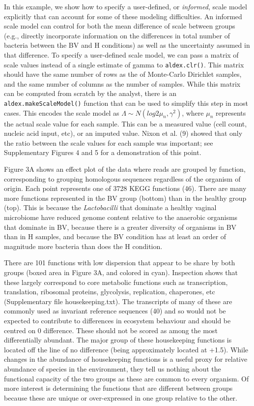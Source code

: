 \documentclass[
]{article}
\begin{document}
In this example, we show how to specify a user-defined, or
\emph{informed}, scale model explicitly that can account for some of
these modeling difficulties. An informed scale model can control for
both the mean difference of scale between groups (e.g., directly
incorporate information on the differences in total number of bacteria
between the BV and H conditions) as well as the uncertainty assumed in
that difference. To specify a user-defined scale model, we can pass a
matrix of scale values instead of a single estimate of gamma to
\texttt{aldex.clr()}. This matrix should have the same number of rows as
the of Monte-Carlo Dirichlet samples, and the same number of columns as
the number of samples. While this matrix can be computed from scratch by
the analyst, there is an \texttt{aldex.makeScaleModel()} function that
can be used to simplify this step in most cases. This encodes the scale
model as \(\Lambda \sim N(log2 \mu_n, \gamma^{2})\), where \(\mu_n\)
represents the actual scale value for each sample. This can be a
measured value (cell count, nucleic acid input, etc), or an imputed
value. Nixon et al. (9) showed that only the ratio between the scale
values for each sample was important; see Supplementary Figures 4 and 5
for a demonstration of this point.

Figure 3A shows an effect plot of the data where reads are grouped by
function, corresponding to grouping homologous sequences regardless of
the organism of origin. Each point represents one of 3728 KEGG functions
(46). There are many more functions represented in the BV group (bottom)
than in the healthy group (top). This is because the
\textit{Lactobacilli} that dominate a healthy vaginal microbiome have
reduced genome content relative to the anaerobic organisms that dominate
in BV, because there is a greater diversity of organisms in BV than in H
samples, and because the BV condition has at least an order of magnitude
more bacteria than does the H condition.

There are 101 functions with low dispersion that appear to be share by
both groups (boxed area in Figure 3A, and colored in cyan). Inspection
shows that these largely correspond to core metabolic functions such as
transcription, translation, ribosomal proteins, glycolysis, replication,
chaperones, etc (Supplementary file housekeeping.txt). The transcripts
of many of these are commonly used as invariant reference sequences (40)
and so would not be expected to contribute to differences in ecosystem
behaviour and should be centred on 0 difference. These should not be
scored as among the most differentially abundant. The major group of
these housekeeping functions is located off the line of no difference
(being approximately located at +1.5). While changes in the abundance of
housekeeping functions is a useful proxy for relative abundance of
species in the environment, they tell us nothing about the functional
capacity of the two groups as these are common to every organism. Of
more interest is determining the functions that are different between
groups because these are unique or over-expressed in one group relative
to the other.
\end{document}
